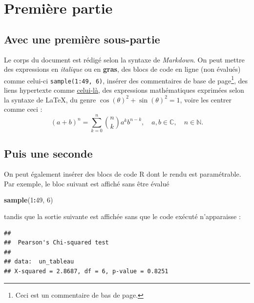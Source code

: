 \documentclass[french,]{compterendu}
\newenvironment{Shaded}{\begin{snugshade}}{\end{snugshade}}
\newcommand{\DecValTok}[1]{\textcolor[rgb]{0.00,0.00,0.81}{#1}}
\newcommand{\FunctionTok}[1]{\textcolor[rgb]{0.13,0.29,0.53}{\textbf{#1}}}
\newcommand{\NormalTok}[1]{#1}
\newcommand{\SpecialCharTok}[1]{\textcolor[rgb]{0.81,0.36,0.00}{\textbf{#1}}}
\let\rmarkdownfootnote\footnote%
\def\footnote{\protect\rmarkdownfootnote}
\theoremstyle{urcastyle}
\theoremstyle{remark}
\begin{document}
% 


  {
  \hypersetup{linkcolor=black}
  \setcounter{tocdepth}{2}
  \tableofcontents
  }

\pagebreak
\normalsize



\section{Première partie}\label{premiuxe8re-partie}

\subsection{Avec une première sous-partie}\label{avec-une-premiuxe8re-sous-partie}

Le corps du document est rédigé selon la syntaxe de \emph{Markdown}. On peut mettre des expressions en \emph{italique} ou en \textbf{gras}, des blocs de code en ligne (non évalués) comme celui-ci \texttt{sample(1:49,\ 6)}, insérer des commentaires de base de page\footnote{Ceci est un commentaire de bas de page.}, des liens hypertexte comme \href{http://univ-reims.fr}{celui-là}, des expressions mathématiques exprimées selon la syntaxe de \LaTeX, du genre \(\cos(\theta) ^2 + \sin(\theta)^2 = 1\), voire les centrer comme ceci :
\[(a+b)^n = \sum_{k=0}^n {n \choose k} a^k b^{n-k}, \quad a,b \in \mathbb{C}, \quad n \in \mathbb{N}.\]

\subsection{Puis une seconde}\label{puis-une-seconde}

On peut également insérer des blocs de code R dont le rendu est paramétrable. Par exemple, le bloc suivant est affiché sans être évalué

\begin{Shaded}
\begin{Highlighting}[]
\FunctionTok{sample}\NormalTok{(}\DecValTok{1}\SpecialCharTok{:}\DecValTok{49}\NormalTok{, }\DecValTok{6}\NormalTok{)}
\end{Highlighting}
\end{Shaded}

tandis que la sortie suivante est affichée sans que le code exécuté n'apparaisse :

\begin{verbatim}
## 
##  Pearson's Chi-squared test
## 
## data:  un_tableau
## X-squared = 2.8687, df = 6, p-value = 0.8251
\end{verbatim}
\end{document}
